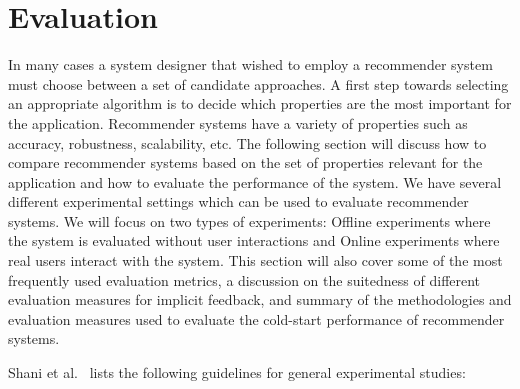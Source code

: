 
\chapter{Evaluation}
\label{evaluation}
\minitoc

\clearpage



In many cases a system designer that wished to employ a recommender system must
choose between a set of candidate approaches. A first step towards selecting an
appropriate algorithm is to decide which properties are the most important for
the application. Recommender systems have a variety of properties such as
accuracy, robustness, scalability, etc. The following section will discuss how
to compare recommender systems based on the set of properties  relevant for the
application and how to evaluate the performance of the system. We have several
different experimental settings which can be used to evaluate recommender systems.
We will focus on two types of experiments:
Offline experiments where the system is evaluated without user interactions and
Online experiments where real users interact with the system. This section will
also cover some of the most frequently used evaluation metrics, a discussion on
the suitedness of different evaluation measures for implicit feedback, and
summary of the methodologies and evaluation measures used to evaluate the
cold-start performance of recommender systems.

Shani et al.\ \cite{Shani2011} lists the following guidelines for general
experimental studies:

